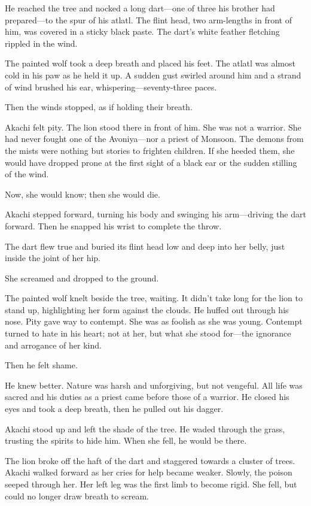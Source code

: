 He reached the tree and nocked a long dart---one of three his brother had prepared---to the spur of his atlatl. The flint head, two arm-lengths in front of him, was covered in a sticky black paste. The dart's white feather fletching rippled in the wind.

The painted wolf took a deep breath and placed his feet. The atlatl was almost cold in his paw as he held it up. A sudden gust swirled around him and a strand of wind brushed his ear, whispering---seventy-three paces.

Then the winds stopped, as if holding their breath.

Akachi felt pity. The lion stood there in front of him. She was not a warrior. She had never fought one of the Avoniya---nor a priest of Monsoon. The demons from the mists were nothing but stories to frighten children. If she heeded them, she would have dropped prone at the first sight of a black ear or the sudden stilling of the wind.

Now, she would know; then she would die.

Akachi stepped forward, turning his body and swinging his arm---driving the dart forward. Then he snapped his wrist to complete the throw.

The dart flew true and buried its flint head low and deep into her belly, just inside the joint of her hip. 

 She screamed and dropped to the ground.

The painted wolf knelt beside the tree, waiting. It didn't take long for the lion to stand up, highlighting her form against the clouds. He huffed out through his nose. Pity gave way to contempt. She was as foolish as she was young. Contempt turned to hate in his heart; not at her, but what she stood for---the ignorance and arrogance of her kind.

Then he felt shame.

He knew better. Nature was harsh and unforgiving, but not vengeful. All life was sacred and his duties as a priest came before those of a warrior. He closed his eyes and took a deep breath, then he pulled out his dagger.

Akachi stood up and left the shade of the tree. He waded through the grass, trusting the spirits to hide him. When she fell, he would be there.

The lion broke off the haft of the dart and staggered towards a cluster of trees. Akachi walked forward as her cries for help became weaker. Slowly, the poison seeped through her. Her left leg was the first limb to become rigid. She fell, but could no longer draw breath to scream.

